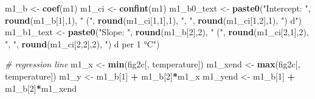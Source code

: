 \documentclass[]{book}
\newenvironment{Shaded}{\begin{snugshade}}{\end{snugshade}}
\newcommand{\CommentTok}[1]{\textcolor[rgb]{0.56,0.35,0.01}{\textit{#1}}}
\newcommand{\DecValTok}[1]{\textcolor[rgb]{0.00,0.00,0.81}{#1}}
\newcommand{\KeywordTok}[1]{\textcolor[rgb]{0.13,0.29,0.53}{\textbf{#1}}}
\newcommand{\NormalTok}[1]{#1}
\newcommand{\OperatorTok}[1]{\textcolor[rgb]{0.81,0.36,0.00}{\textbf{#1}}}
\newcommand{\StringTok}[1]{\textcolor[rgb]{0.31,0.60,0.02}{#1}}
\begin{document}
\begin{Shaded}
\begin{Highlighting}[]
\NormalTok{m1_b <-}\StringTok{ }\KeywordTok{coef}\NormalTok{(m1)}
\NormalTok{m1_ci <-}\StringTok{ }\KeywordTok{confint}\NormalTok{(m1)}
\NormalTok{m1_b0_text <-}\StringTok{ }\KeywordTok{paste0}\NormalTok{(}\StringTok{"Intercept: "}\NormalTok{,}
                  \KeywordTok{round}\NormalTok{(m1_b[}\DecValTok{1}\NormalTok{],}\DecValTok{1}\NormalTok{),}
                  \StringTok{" ("}\NormalTok{,}
                  \KeywordTok{round}\NormalTok{(m1_ci[}\DecValTok{1}\NormalTok{,}\DecValTok{1}\NormalTok{],}\DecValTok{1}\NormalTok{),}
                  \StringTok{", "}\NormalTok{,}
                  \KeywordTok{round}\NormalTok{(m1_ci[}\DecValTok{1}\NormalTok{,}\DecValTok{2}\NormalTok{],}\DecValTok{1}\NormalTok{),}
                  \StringTok{") d"}\NormalTok{)}
\NormalTok{m1_b1_text <-}\StringTok{ }\KeywordTok{paste0}\NormalTok{(}\StringTok{"Slope: "}\NormalTok{,}
                  \KeywordTok{round}\NormalTok{(m1_b[}\DecValTok{2}\NormalTok{],}\DecValTok{2}\NormalTok{),}
                  \StringTok{" ("}\NormalTok{,}
                  \KeywordTok{round}\NormalTok{(m1_ci[}\DecValTok{2}\NormalTok{,}\DecValTok{1}\NormalTok{],}\DecValTok{2}\NormalTok{),}
                  \StringTok{", "}\NormalTok{,}
                  \KeywordTok{round}\NormalTok{(m1_ci[}\DecValTok{2}\NormalTok{,}\DecValTok{2}\NormalTok{],}\DecValTok{2}\NormalTok{),}
                  \StringTok{") d per 1 °C"}\NormalTok{)}

\CommentTok{# regression line}
\NormalTok{m1_x <-}\StringTok{ }\KeywordTok{min}\NormalTok{(fig2c[, temperature])}
\NormalTok{m1_xend <-}\StringTok{ }\KeywordTok{max}\NormalTok{(fig2c[, temperature])}
\NormalTok{m1_y <-}\StringTok{ }\NormalTok{m1_b[}\DecValTok{1}\NormalTok{] }\OperatorTok{+}\StringTok{ }\NormalTok{m1_b[}\DecValTok{2}\NormalTok{]}\OperatorTok{*}\NormalTok{m1_x}
\NormalTok{m1_yend <-}\StringTok{ }\NormalTok{m1_b[}\DecValTok{1}\NormalTok{] }\OperatorTok{+}\StringTok{ }\NormalTok{m1_b[}\DecValTok{2}\NormalTok{]}\OperatorTok{*}\NormalTok{m1_xend}


\end{Highlighting}
\end{Shaded}
\end{document}
